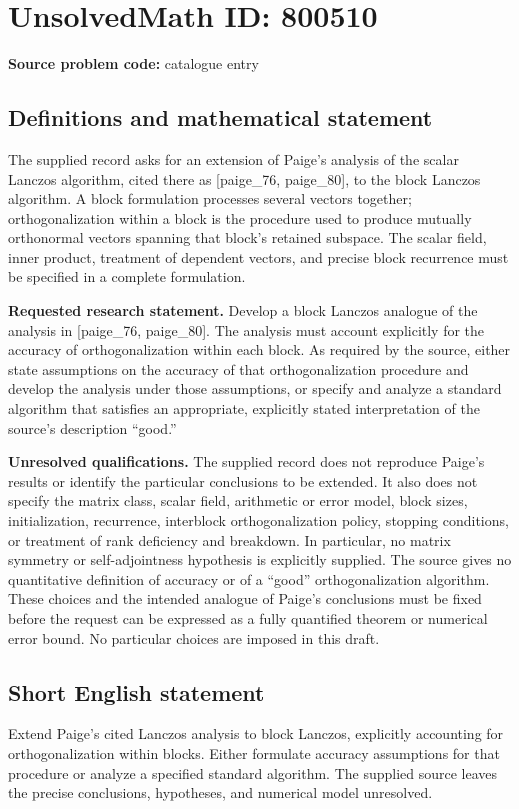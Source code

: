 \documentclass[11pt]{article}
\begin{document}
\section*{UnsolvedMath ID: 800510}
\textbf{Source problem code:} catalogue entry
\subsection{Definitions and mathematical statement}
The supplied record asks for an extension of Paige's analysis of the scalar Lanczos algorithm, cited there as [paige\_76, paige\_80], to the block Lanczos algorithm. A block formulation processes several vectors together; orthogonalization within a block is the procedure used to produce mutually orthonormal vectors spanning that block's retained subspace. The scalar field, inner product, treatment of dependent vectors, and precise block recurrence must be specified in a complete formulation.

\textbf{Requested research statement.} Develop a block Lanczos analogue of the analysis in [paige\_76, paige\_80]. The analysis must account explicitly for the accuracy of orthogonalization within each block. As required by the source, either state assumptions on the accuracy of that orthogonalization procedure and develop the analysis under those assumptions, or specify and analyze a standard algorithm that satisfies an appropriate, explicitly stated interpretation of the source's description ``good.''

\textbf{Unresolved qualifications.} The supplied record does not reproduce Paige's results or identify the particular conclusions to be extended. It also does not specify the matrix class, scalar field, arithmetic or error model, block sizes, initialization, recurrence, interblock orthogonalization policy, stopping conditions, or treatment of rank deficiency and breakdown. In particular, no matrix symmetry or self-adjointness hypothesis is explicitly supplied. The source gives no quantitative definition of accuracy or of a ``good'' orthogonalization algorithm. These choices and the intended analogue of Paige's conclusions must be fixed before the request can be expressed as a fully quantified theorem or numerical error bound. No particular choices are imposed in this draft.
\subsection{Short English statement}
Extend Paige's cited Lanczos analysis to block Lanczos, explicitly accounting for orthogonalization within blocks. Either formulate accuracy assumptions for that procedure or analyze a specified standard algorithm. The supplied source leaves the precise conclusions, hypotheses, and numerical model unresolved.
\end{document}
